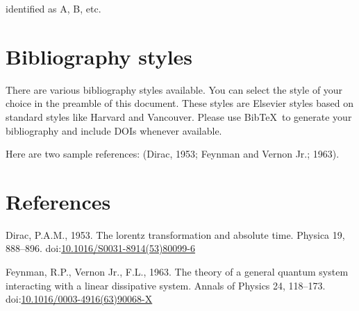 \documentclass[]{elsarticle} %
\newlength{\cslhangindent}
\newenvironment{CSLReferences}[2] %
 {%
  \setlength{\parindent}{0pt}
  \ifodd #1 \everypar{\setlength{\hangindent}{\cslhangindent}}\ignorespaces\fi
  \ifnum #2 > 0
  \setlength{\parskip}{#2\baselineskip}
  \fi
 }%
 {}
\begin{document}
identified as A, B, etc.

\hypertarget{bibliography-styles}{%
\section{Bibliography styles}\label{bibliography-styles}}

There are various bibliography styles available. You can select the
style of your choice in the preamble of this document. These styles are
Elsevier styles based on standard styles like Harvard and Vancouver.
Please use BibTeX~to generate your bibliography and include DOIs
whenever available.

Here are two sample references: (Dirac, 1953; Feynman and Vernon Jr.;
1963).

\hypertarget{references}{%
\section*{References}\label{references}}

\hypertarget{refs}{}
\begin{CSLReferences}{1}{0}
\leavevmode{}%
Dirac, P.A.M., 1953. The lorentz transformation and absolute time.
Physica 19, 888--896.
doi:\href{https://doi.org/10.1016/S0031-8914(53)80099-6}{10.1016/S0031-8914(53)80099-6}

\leavevmode{}%
Feynman, R.P., Vernon Jr., F.L., 1963. The theory of a general quantum
system interacting with a linear dissipative system. Annals of Physics
24, 118--173.
doi:\href{https://doi.org/10.1016/0003-4916(63)90068-X}{10.1016/0003-4916(63)90068-X}

\end{CSLReferences}
\end{document}
